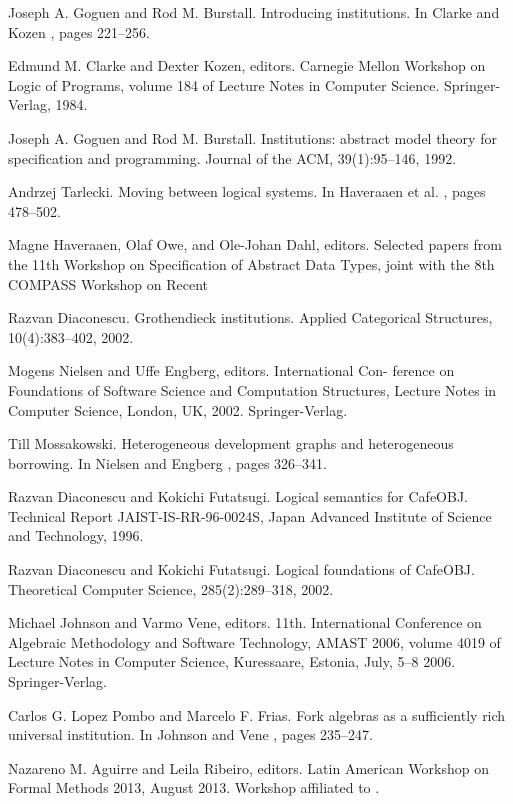 \begin{thebibliography}{tesis}
 Joseph A. Goguen and Rod M. Burstall. Introducing institutions. In Clarke and Kozen \cite{CK84}, pages 221–256.  

 Edmund M. Clarke and Dexter Kozen, editors. Carnegie Mellon Workshop on Logic of Programs, volume 184 of Lecture Notes in Computer Science. Springer-Verlag, 1984. 

 Joseph A. Goguen and Rod M. Burstall. Institutions: abstract model theory for specification and programming. Journal of the ACM, 39(1):95–146, 1992. 

 Andrzej Tarlecki. Moving between logical systems. In Haveraaen et al. \cite{HOD96}, pages 478–502.

 Magne Haveraaen, Olaf Owe, and Ole-Johan Dahl, editors. Selected papers from the 11th Workshop on Specification of Abstract Data Types, joint with the 8th COMPASS Workshop on Recent

 Razvan Diaconescu. Grothendieck institutions. Applied Categorical Structures, 10(4):383–402, 2002.

 Mogens Nielsen and Uffe Engberg, editors. International Con- ference on Foundations of Software Science and Computation Structures, Lecture Notes in Computer Science, London, UK, 2002. Springer-Verlag.

 Till Mossakowski. Heterogeneous development graphs and heterogeneous borrowing. In Nielsen and Engberg \cite{NE02}, pages 326–341. 

 Razvan Diaconescu and Kokichi Futatsugi. Logical semantics for CafeOBJ. Technical Report JAIST-IS-RR-96-0024S, Japan Advanced Institute of Science and Technology, 1996. 

 Razvan Diaconescu and Kokichi Futatsugi. Logical foundations of CafeOBJ. Theoretical Computer Science, 285(2):289–318, 2002. 

  Michael Johnson and Varmo Vene, editors. 11th. International Conference on Algebraic Methodology and Software Technology, AMAST 2006, volume 4019 of Lecture Notes in Computer Science, Kuressaare, Estonia, July, 5–8 2006. Springer-Verlag. 

 Carlos G. Lopez Pombo and Marcelo F. Frias. Fork algebras as a sufficiently rich universal institution. In Johnson and Vene \cite{JV06}, pages 235–247. 

 Nazareno M. Aguirre and Leila Ribeiro, editors. Latin American Workshop on Formal Methods 2013, August 2013. Workshop affiliated to \cite{DM13}. 


\end{thebibliography}

